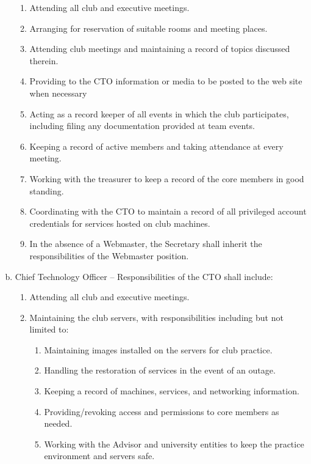 \documentclass[10pt]{article}
\begin{document}
\begin{enumerate}[(a)]
    \begin{enumerate}[1.]
        \item Attending all club and executive meetings.
        \item Arranging for reservation of suitable rooms and meeting places.
        \item Attending club meetings and maintaining a record of topics discussed therein.
        \item Providing to the CTO information or media to be posted to the web site when necessary
        \item Acting as a record keeper of all events in which the club participates, including filing any documentation provided at team events.
        \item Keeping a record of active members and taking attendance at every meeting.
        \item Working with the treasurer to keep a record of the core members in good standing.
        \item Coordinating with the CTO to maintain a record of all privileged account credentials for services hosted on club machines.
        \item In the absence of a Webmaster, the Secretary shall inherit the responsibilities of the Webmaster position.
    \end{enumerate}
    \item Chief Technology Officer -- Responsibilities of the CTO shall include:
    \begin{enumerate}[1.]
        \item Attending all club and executive meetings.
        \item Maintaining the club servers, with responsibilities including but not limited to:
        \begin{enumerate}
            \item Maintaining images installed on the servers for club practice.
            \item Handling the restoration of services in the event of an outage.
            \item Keeping a record of machines, services, and networking information.
            \item Providing/revoking access and permissions to core members as needed.
            \item Working with the Advisor and university entities to keep the practice environment and servers safe.
        \end{enumerate}

\end{enumerate}
\end{enumerate}
\end{document}
